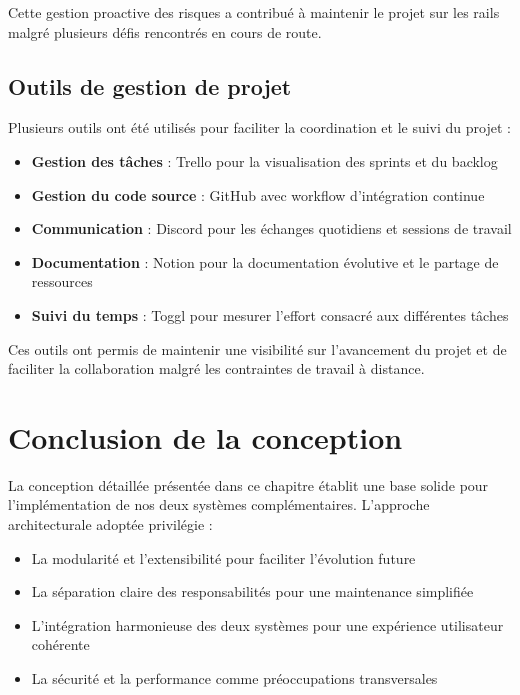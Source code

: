Cette gestion proactive des risques a contribué à maintenir le projet sur les rails malgré plusieurs défis rencontrés en cours de route.

\subsection{Outils de gestion de projet}

Plusieurs outils ont été utilisés pour faciliter la coordination et le suivi du projet :

\begin{itemize}
  \item \textbf{Gestion des tâches} : Trello pour la visualisation des sprints et du backlog
  
  \item \textbf{Gestion du code source} : GitHub avec workflow d'intégration continue
  
  \item \textbf{Communication} : Discord pour les échanges quotidiens et sessions de travail
  
  \item \textbf{Documentation} : Notion pour la documentation évolutive et le partage de ressources
  
  \item \textbf{Suivi du temps} : Toggl pour mesurer l'effort consacré aux différentes tâches
\end{itemize}

Ces outils ont permis de maintenir une visibilité sur l'avancement du projet et de faciliter la collaboration malgré les contraintes de travail à distance.

\section{Conclusion de la conception}

La conception détaillée présentée dans ce chapitre établit une base solide pour l'implémentation de nos deux systèmes complémentaires. L'approche architecturale adoptée privilégie :

\begin{itemize}
  \item La modularité et l'extensibilité pour faciliter l'évolution future
  
  \item La séparation claire des responsabilités pour une maintenance simplifiée
  
  \item L'intégration harmonieuse des deux systèmes pour une expérience utilisateur cohérente
  
  \item La sécurité et la performance comme préoccupations transversales
\end{itemize}

